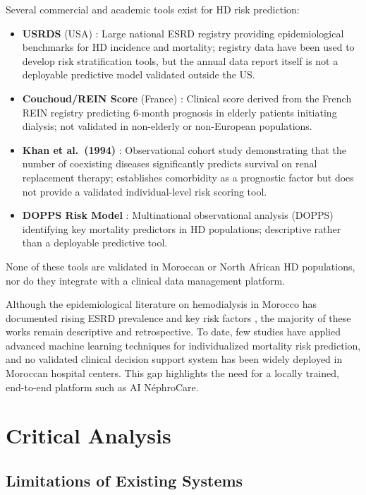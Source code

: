 \documentclass[12pt,a4paper,twoside]{report}
\begin{document}
Several commercial and academic tools exist for HD risk prediction:
\begin{itemize}
  \item \textbf{USRDS} (USA) \cite{usrds2022}: Large national ESRD registry providing epidemiological benchmarks for HD incidence and mortality; registry data have been used to develop risk stratification tools, but the annual data report itself is not a deployable predictive model validated outside the US.
  \item \textbf{Couchoud/REIN Score} (France) \cite{couchoud2009}: Clinical score derived from the French REIN registry predicting 6-month prognosis in elderly patients initiating dialysis; not validated in non-elderly or non-European populations.
  \item \textbf{Khan et al.\ (1994)} \cite{khan2008score}: Observational cohort study demonstrating that the number of coexisting diseases significantly predicts survival on renal replacement therapy; establishes comorbidity as a prognostic factor but does not provide a validated individual-level risk scoring tool.
  \item \textbf{DOPPS Risk Model} \cite{dopps2022}: Multinational observational analysis (DOPPS) identifying key mortality predictors in HD populations; descriptive rather than a deployable predictive tool.
\end{itemize}

None of these tools are validated in Moroccan or North African HD populations, nor do they integrate with a clinical data management platform.

\medskip
Although the epidemiological literature on hemodialysis in Morocco has documented rising ESRD prevalence and key risk factors \cite{maoujoud2017morocco}, the majority of these works remain descriptive and retrospective. To date, few studies have applied advanced machine learning techniques for individualized mortality risk prediction, and no validated clinical decision support system has been widely deployed in Moroccan hospital centers. This gap highlights the need for a locally trained, end-to-end platform such as AI NéphroCare.

\section{Critical Analysis}\label{sec:critical}

\subsection{Limitations of Existing Systems}
\end{document}
